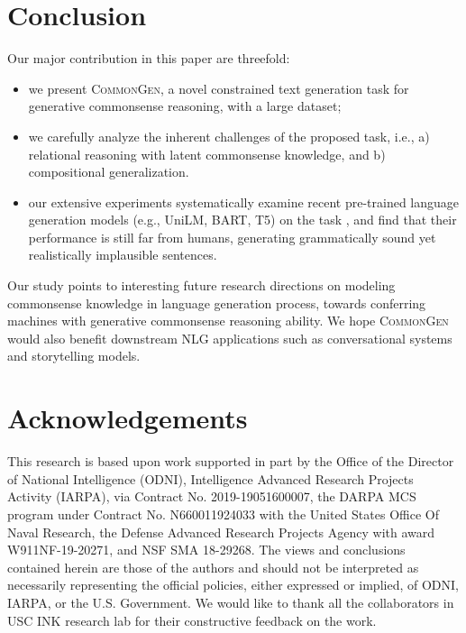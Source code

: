 \documentclass[11pt,a4paper]{article}
\begin{document}
	\section{Conclusion}
	\label{sec:conclusion} 
	Our major contribution in this paper are threefold:
	\begin{itemize}
	    \item  we present \textsc{CommonGen}, a novel constrained text generation task for generative commonsense reasoning, with a large dataset;
	    \item we carefully analyze the inherent challenges of the proposed task, i.e.,  a) relational reasoning with latent commonsense knowledge, and b) compositional generalization.
	    \item our extensive experiments systematically examine recent pre-trained language generation models (e.g., UniLM, BART, T5) on the task , and find that their performance is still far from humans, generating grammatically sound yet realistically implausible sentences.
	\end{itemize}
Our study points to interesting future research directions on modeling commonsense knowledge in language generation process, towards conferring machines with generative commonsense reasoning ability. 
	We hope \textsc{CommonGen} would also benefit downstream NLG applications such as conversational systems and storytelling models.


	
	

 	
		\section*{Acknowledgements}
This research is based upon work supported in part by the Office of the Director of National Intelligence (ODNI), Intelligence Advanced Research Projects Activity (IARPA), via Contract No. 2019-19051600007, the DARPA MCS program under Contract No. N660011924033 with the United States Office Of Naval Research, the Defense Advanced Research Projects Agency with award W911NF-19-20271, and NSF SMA 18-29268. 
The views and conclusions contained herein are those of the authors and should not be interpreted as necessarily representing the official policies, either expressed or implied, of ODNI, IARPA, or the U.S. Government. We would like to thank all the collaborators in USC INK research lab for their constructive feedback on the work.
	
	
	
	
	
	
\end{document}

